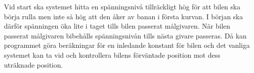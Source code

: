 Vid start ska systemet hitta en spänningsnivå tillräckligt hög för att bilen
ska börja rulla men inte så hög att den åker av banan i första kurvan. I början
ska därför spänningen öka lite i taget tills bilen passerat målgivaren. När
bilen passerat målgivaren bibehålls spänningsnivån tills nästa givare passeras.
Då kan programmet göra beräkningar för en inledande konstant för bilen och det
vanliga systemet kan ta vid och kontrollera bilens förväntade position mot dess
uträknade position.
